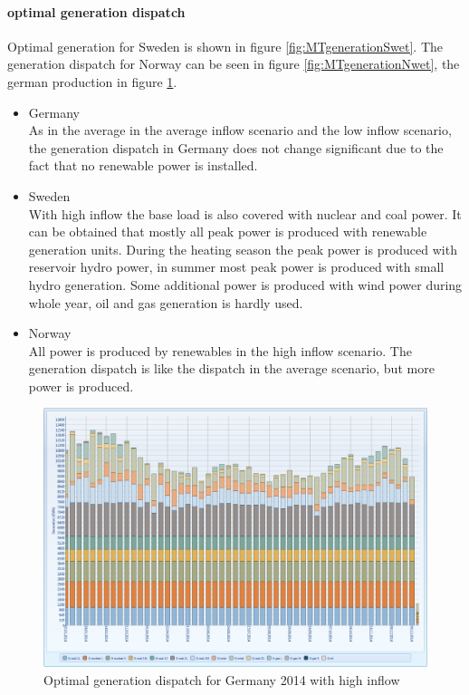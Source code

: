 \documentclass{article}
\begin{document}
\paragraph{optimal generation dispatch\\}
Optimal generation for Sweden is shown in figure \ref{fig:MTgenerationSwet}. The generation dispatch for Norway can be seen in figure \ref{fig:MTgenerationNwet}, the german production in figure \ref{fig:MTgenerationGwet}.
\begin{itemize}
\item Germany\\
As in the average in the average inflow scenario and the low inflow scenario, the generation dispatch in Germany does not change significant due to the fact that no renewable power is installed.
\item Sweden\\
With high inflow the base load is also covered with nuclear and coal power. It can be obtained that mostly all peak power is produced with renewable generation units. During the heating season the peak power is produced with reservoir hydro power, in summer most peak power is produced with small hydro generation. Some additional power is produced with wind power during whole year, oil and gas generation is hardly used.
\item Norway\\
All power is produced by renewables in the high inflow scenario. The generation dispatch is like the dispatch in the average scenario, but more power is produced.
\end{itemize}
\begin{figure}[htbp]
\begin{center}
\includegraphics[width=13cm,keepaspectratio=true]{figures/wetcase/MTgenerationGwet}
\caption{Optimal generation dispatch for Germany 2014 with high inflow}
\label{fig:MTgenerationGwet}
\end{center}
\end{figure}
\end{document}
